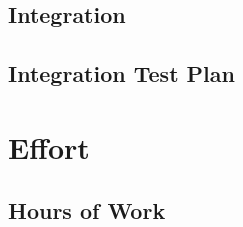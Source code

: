 \documentclass[12pt, a4paper]{report}
\begin{document}
\section{Integration}


\section{Integration Test Plan}


\chapter{Effort}
\label{ch:effort}

\section{Hours of Work}



%

%
\end{document}
